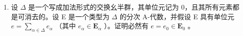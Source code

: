 \BourbakiExercisesSection

\begin{enumerate}
\def\labelenumi{\arabic{enumi}.}
\tightlist
\item
  设 \(\Delta\) 是一个写成加法形式的交换幺半群，其单位元记为 0，且其所有元素都是可消去的。设 E 是一个类型为 \(\Delta\) 的分次 A-代数，并假设 E 具有单位元 \(e = \sum_{\alpha \in \Delta} e_{\alpha}\) （其中 \(e_{\alpha} \in \mathbf{E}_{\alpha}\) ）。证明必然有 \(e = e_0 \in \mathbf{E}_0\) 。
\end{enumerate}
\relax{}
